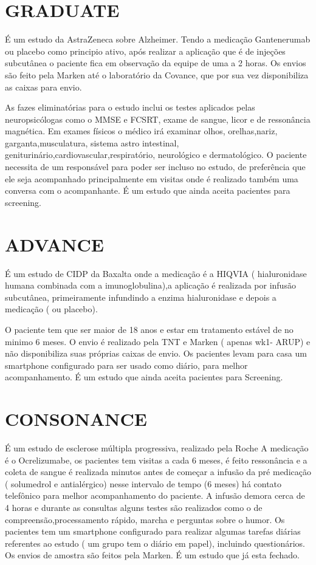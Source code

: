 \section{GRADUATE}

É  um estudo da AstraZeneca sobre Alzheimer. Tendo a medicação Gantenerumab
ou placebo como principio ativo, após realizar a aplicação que é de injeções
subcutânea o paciente fica em observação da equipe de uma a 2 horas. 
Os envios são feito pela Marken até o laboratório da Covance, que por sua vez disponibiliza as caixas para envio. 

As fazes eliminatórias para o estudo inclui os testes aplicados pelas
neuropsicólogas como o MMSE e FCSRT, exame de sangue, licor e de ressonância
magnética. Em exames físicos o médico irá examinar olhos,
orelhas,nariz, garganta,musculatura, sistema astro intestinal,
geniturinário,cardiovascular,respiratório, neurológico e dermatológico. O
paciente necessita de um responsável para poder ser incluso no estudo, de
preferência que ele seja acompanhado principalmente em visitas onde é realizado
também uma conversa com o acompanhante. É um estudo que ainda aceita pacientes para screening. 

\section{ADVANCE}

É um estudo de CIDP da Baxalta onde a medicação é a HIQVIA ( hialuronidase
humana combinada com a imunoglobulina),a aplicação é realizada por infusão
subcutânea, primeiramente infundindo a enzima hialuronidase e depois a
medicação ( ou placebo). 

O paciente tem que ser maior de 18 anos e estar em tratamento estável de no
minimo 6 meses. O envio é realizado pela TNT e Marken ( apenas wk1- ARUP) e
não disponibiliza suas próprias caixas de envio. Os pacientes levam para casa um
smartphone configurado para ser usado como diário, para melhor acompanhamento. 
É um estudo que ainda aceita pacientes para Screening. 

\section{CONSONANCE}

É um estudo de esclerose múltipla progressiva, realizado pela Roche
A medicação é o Ocrelizumabe, os pacientes tem visitas a cada 6 meses, é feito ressonância e a coleta de sangue é realizada minutos antes de começar a infusão da pré medicação ( solumedrol e
antialérgico) nesse intervalo de tempo (6 meses) há contato telefônico para
melhor acompanhamento do paciente. A infusão demora cerca de 4 horas e durante
as consultas alguns testes são realizados como o de compreensão,processamento
rápido, marcha e perguntas sobre o humor. Os pacientes tem um smartphone
configurado para realizar algumas tarefas diárias referentes ao estudo ( um grupo
tem o diário em papel), incluindo questionários. Os envios de amostra são feitos pela Marken.
É um estudo que já esta fechado. 


